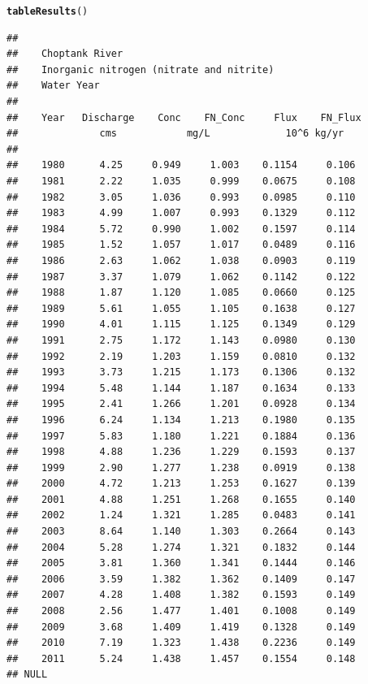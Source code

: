 \documentclass[a4paper,11pt]{article}\usepackage{graphicx, color}
\makeatletter
\newcommand{\hlfunctioncall}[1]{\textcolor[rgb]{0.501960784313725,0,0.329411764705882}{\textbf{#1}}}%
\newenvironment{kframe}{%
 \def\at@end@of@kframe{}%
 \ifinner\ifhmode%
  \def\at@end@of@kframe{\end{minipage}}%
  \begin{minipage}{\columnwidth}%
 \fi\fi%
 \def\FrameCommand##1{\hskip\@totalleftmargin \hskip-\fboxsep
 \colorbox{shadecolor}{##1}\hskip-\fboxsep
     \hskip-\linewidth \hskip-\@totalleftmargin \hskip\columnwidth}%
 \MakeFramed {\advance\hsize-\width
   \@totalleftmargin\z@ \linewidth\hsize
   \@setminipage}}%
 {\par\unskip\endMakeFramed%
 \at@end@of@kframe}
\newenvironment{knitrout}{}{} %
\makeatother
\begin{document}
\begin{knitrout}
\color{fgcolor}\begin{kframe}
\begin{alltt}
\hlfunctioncall{tableResults}()
\end{alltt}
\begin{verbatim}
## 
##    Choptank River 
##    Inorganic nitrogen (nitrate and nitrite)
##    Water Year 
## 
##    Year   Discharge    Conc    FN_Conc     Flux    FN_Flux
##              cms            mg/L             10^6 kg/yr 
## 
##    1980      4.25     0.949     1.003    0.1154     0.106
##    1981      2.22     1.035     0.999    0.0675     0.108
##    1982      3.05     1.036     0.993    0.0985     0.110
##    1983      4.99     1.007     0.993    0.1329     0.112
##    1984      5.72     0.990     1.002    0.1597     0.114
##    1985      1.52     1.057     1.017    0.0489     0.116
##    1986      2.63     1.062     1.038    0.0903     0.119
##    1987      3.37     1.079     1.062    0.1142     0.122
##    1988      1.87     1.120     1.085    0.0660     0.125
##    1989      5.61     1.055     1.105    0.1638     0.127
##    1990      4.01     1.115     1.125    0.1349     0.129
##    1991      2.75     1.172     1.143    0.0980     0.130
##    1992      2.19     1.203     1.159    0.0810     0.132
##    1993      3.73     1.215     1.173    0.1306     0.132
##    1994      5.48     1.144     1.187    0.1634     0.133
##    1995      2.41     1.266     1.201    0.0928     0.134
##    1996      6.24     1.134     1.213    0.1980     0.135
##    1997      5.83     1.180     1.221    0.1884     0.136
##    1998      4.88     1.236     1.229    0.1593     0.137
##    1999      2.90     1.277     1.238    0.0919     0.138
##    2000      4.72     1.213     1.253    0.1627     0.139
##    2001      4.88     1.251     1.268    0.1655     0.140
##    2002      1.24     1.321     1.285    0.0483     0.141
##    2003      8.64     1.140     1.303    0.2664     0.143
##    2004      5.28     1.274     1.321    0.1832     0.144
##    2005      3.81     1.360     1.341    0.1444     0.146
##    2006      3.59     1.382     1.362    0.1409     0.147
##    2007      4.28     1.408     1.382    0.1593     0.149
##    2008      2.56     1.477     1.401    0.1008     0.149
##    2009      3.68     1.409     1.419    0.1328     0.149
##    2010      7.19     1.323     1.438    0.2236     0.149
##    2011      5.24     1.438     1.457    0.1554     0.148
## NULL
\end{verbatim}
\end{kframe}
\end{knitrout}
\end{document}
